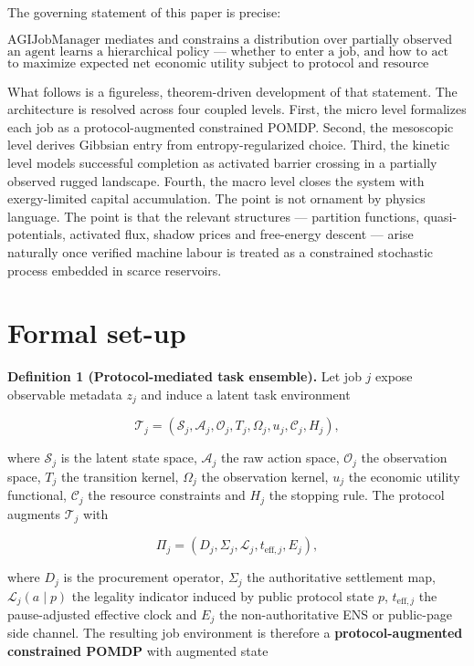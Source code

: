 The governing statement of this paper is precise:

\[
\text{AGIJobManager mediates and constrains a distribution over partially observed task environments;}
\] \[
\text{an agent learns a hierarchical policy --- whether to enter a job, and how to act within it ---}
\] \[
\text{to maximize expected net economic utility subject to protocol and resource constraints.}
\]

What follows is a figureless, theorem-driven development of that
statement. The architecture is resolved across four coupled levels.
First, the micro level formalizes each job as a protocol-augmented
constrained POMDP. Second, the mesoscopic level derives Gibbsian entry
from entropy-regularized choice. Third, the kinetic level models
successful completion as activated barrier crossing in a partially
observed rugged landscape. Fourth, the macro level closes the system
with exergy-limited capital accumulation. The point is not ornament by
physics language. The point is that the relevant structures ---
partition functions, quasi-potentials, activated flux, shadow prices and
free-energy descent --- arise naturally once verified machine labour is
treated as a constrained stochastic process embedded in scarce
reservoirs.

\section{Formal set-up}\label{formal-set-up}

\textbf{Definition 1 (Protocol-mediated task ensemble).} Let job \(j\)
expose observable metadata \(z_j\) and induce a latent task environment

\[
\mathcal{T}_j = (\mathcal{S}_j,\mathcal{A}_j,\mathcal{O}_j,T_j,\Omega_j,u_j,\mathcal{C}_j,H_j),
\]

where \(\mathcal{S}_j\) is the latent state space, \(\mathcal{A}_j\) the
raw action space, \(\mathcal{O}_j\) the observation space, \(T_j\) the
transition kernel, \(\Omega_j\) the observation kernel, \(u_j\) the
economic utility functional, \(\mathcal{C}_j\) the resource constraints
and \(H_j\) the stopping rule. The protocol augments \(\mathcal{T}_j\)
with

\[
\Pi_j = (D_j,\Sigma_j,\mathcal{L}_j,t_{\mathrm{eff},j},E_j),
\]

where \(D_j\) is the procurement operator, \(\Sigma_j\) the
authoritative settlement map, \(\mathcal{L}_j(a\mid p)\) the legality
indicator induced by public protocol state \(p\), \(t_{\mathrm{eff},j}\)
the pause-adjusted effective clock and \(E_j\) the non-authoritative ENS
or public-page side channel. The resulting job environment is therefore
a \textbf{protocol-augmented constrained POMDP} with augmented state

